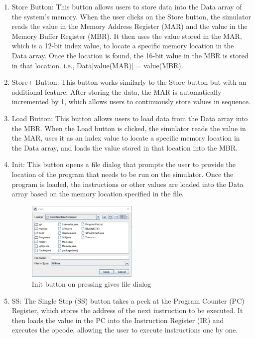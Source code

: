 \documentclass[10pt]{article}
\begin{document}
\begin{enumerate}
  \item Store Button: This button allows users to store data into the Data array of the system's memory. 
  When the user clicks on the Store button, the simulator reads the value in the Memory Address Register (MAR) 
  and the value in the Memory Buffer Register (MBR). It then uses the value stored in the MAR, 
  which is a 12-bit index value, to locate a specific memory location in the Data array. 
  Once the location is found, the 16-bit value in the MBR is stored in that location.\newline 
  i.e., Data[value(MAR)] = value(MBR).

  \item Store+ Button: This button works similarly to the Store button but with an additional feature. 
  After storing the data, the MAR is automatically incremented by 1, which allows users to continuously 
  store values in sequence.
  
  \item Load Button: This button allows users to load data from the Data array into the MBR. When the 
  Load button is clicked, the simulator reads the value in the MAR, uses it as an index value to locate a 
  specific memory location in the Data array, and loads the value stored in that location into the MBR.
  
  \item Init: This button opens a file dialog that prompts the user to provide the location of the program that needs 
  to be run on the simulator. Once the program is loaded, the instructions or other values are loaded into the 
  Data array based on the memory location specified in the file.
  \begin{figure}[H]
    \centering
    \includegraphics[width=0.5\textwidth]{Pics/Fig4.png}
    \caption{Init button on pressing gives file dialog}
    \label{fig:init_button}
  \end{figure}
  \item SS: The Single Step (SS) button takes a peek at the Program Counter (PC) Register, which stores the 
  address of the next instruction to be executed. It then loads the value in the PC into the Instruction 
  Register (IR) and executes the opcode, allowing the user to execute instructions one by one.
  

\end{enumerate}
\end{document}
